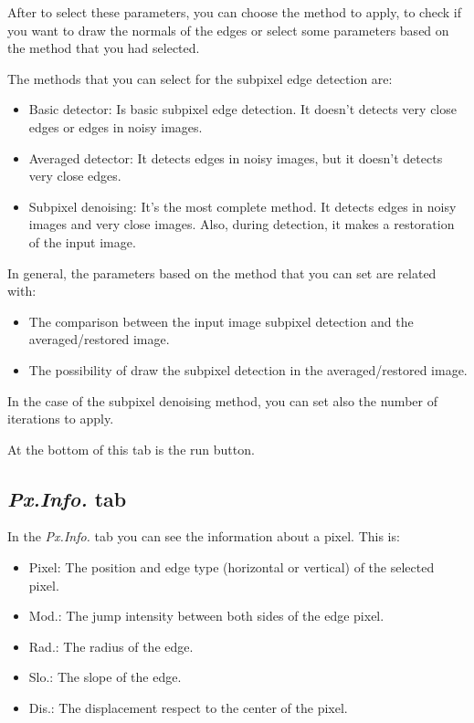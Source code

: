 \documentclass{article}
\begin{document}
After to select these parameters, you can choose the method to apply, to check if you want to draw the normals of the edges or select some parameters based on the method that you had selected. 

The methods that you can select for the subpixel edge detection are:
\begin{itemize}
	\item Basic detector: Is basic subpixel edge detection. It doesn't detects very close edges or edges in noisy images.
	\item Averaged detector: It detects edges in noisy images, but it doesn't detects very close edges.
	\item Subpixel denoising: It's the most complete method. It detects edges in noisy images and very close images. Also, during detection, it makes a restoration of the input image.
\end{itemize}

In general, the parameters based on the method that you can set are related with: 
\begin{itemize}
	\item The comparison between the input image subpixel detection and the averaged/restored image.
	\item The possibility of draw the subpixel detection in the averaged/restored image.
\end{itemize}

In the case of the subpixel denoising method, you can set also the number of iterations to apply.

At the bottom of this tab is the run button.

\subsection{\emph{Px.Info.} tab}
In the \emph{Px.Info.} tab you can see the information about a pixel. This is:
\begin{itemize}
	\item Pixel: The position and edge type (horizontal or vertical) of the selected pixel.
	\item Mod.: The jump intensity between both sides of the edge pixel.
	\item Rad.: The radius of the edge.
	\item Slo.: The slope of the edge.
	\item Dis.: The displacement respect to the center of the pixel.
\end{itemize}
\end{document}

